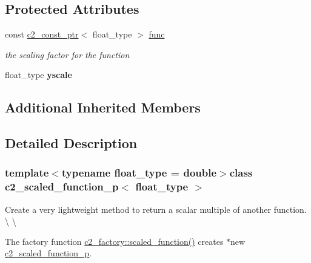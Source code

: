 \subsection*{Protected Attributes}
\begin{DoxyCompactItemize}
\item 
\hypertarget{classc2__scaled__function__p_a4ee175f7c60c6967c44418062b93cbbb}{const \hyperlink{classc2__const__ptr}{c2\-\_\-const\-\_\-ptr}$<$ float\-\_\-type $>$ \hyperlink{classc2__scaled__function__p_a4ee175f7c60c6967c44418062b93cbbb}{func}}\label{classc2__scaled__function__p_a4ee175f7c60c6967c44418062b93cbbb}

\begin{DoxyCompactList}\small\item\em the scaling factor for the function \end{DoxyCompactList}\item 
\hypertarget{classc2__scaled__function__p_a4ea4ca9743bd3783752a9ee5de49ef0f}{float\-\_\-type {\bfseries yscale}}\label{classc2__scaled__function__p_a4ea4ca9743bd3783752a9ee5de49ef0f}

\end{DoxyCompactItemize}
\subsection*{Additional Inherited Members}


\subsection{Detailed Description}
\subsubsection*{template$<$typename float\-\_\-type = double$>$class c2\-\_\-scaled\-\_\-function\-\_\-p$<$ float\-\_\-type $>$}

Create a very lightweight method to return a scalar multiple of another function. \textbackslash{} \textbackslash{}

The factory function \hyperlink{classc2__factory_a81a7b686b7ffa389ad4dcd8d18997332}{c2\-\_\-factory\-::scaled\-\_\-function()} creates $\ast$new \hyperlink{classc2__scaled__function__p}{c2\-\_\-scaled\-\_\-function\-\_\-p}. 

